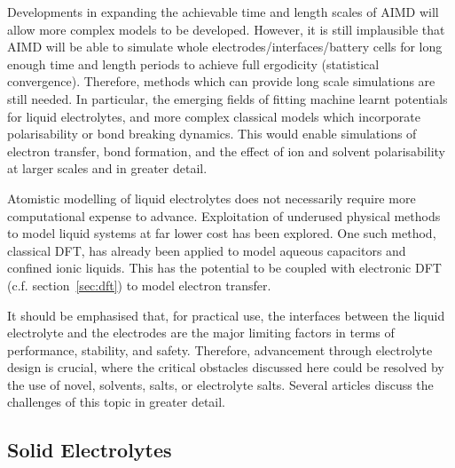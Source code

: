 \documentclass[../main.tex]{subfiles}
\begin{document}
Developments in expanding the achievable time and length scales of AIMD will allow more complex models to be developed. However, it is still implausible that AIMD will be able to simulate whole electrodes/interfaces/battery cells for long enough time and length periods to achieve full ergodicity (statistical convergence). Therefore, methods which can provide long scale simulations are still needed. In particular, the emerging fields of fitting machine learnt potentials for liquid electrolytes,\cite{shao2021modelling, hellstrom2016concentration, tovey2020dft} and more complex classical models which incorporate polarisability\cite{marin-lafleche_metalwalls_2020,schroder_polarizable_2020} or bond breaking dynamics.\cite{fedkin2019development,hossain2020lithium} This would enable simulations of electron transfer, bond formation, and the effect of ion and solvent polarisability at larger scales and in greater detail.
    
Atomistic modelling of liquid electrolytes does not necessarily require more computational expense to advance. Exploitation of underused physical methods to model liquid systems at far lower cost has been explored. One such method, classical DFT, has already been applied to model aqueous capacitors\cite{jeanmairet2019study} and confined ionic liquids.\cite{forsman_classical_2011} This has the potential to be coupled with electronic DFT (c.f. section~\ref{sec:dft}) to model electron transfer.\cite{jeanmairet2019molecular}

It should be emphasised that, for practical use, the interfaces between the liquid electrolyte and the electrodes are the major limiting factors in terms of performance, stability, and safety. Therefore, advancement through electrolyte design is crucial, where the critical obstacles discussed here could be resolved by the use of novel, solvents, salts, or electrolyte salts. Several articles discuss the challenges of this topic in greater detail.\cite{jie2020advanced,francis2020lithium,xiong2018toward}

\subsection{Solid Electrolytes}
\label{sec:solid_electrolytes}
\end{document}
